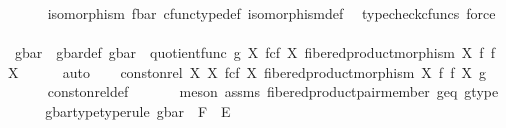 \begin{isabellebody}
\ \ \ \ \isamarkupfalse%
\ {\isacartoucheopen}isomorphism\ f{\isacharunderscore}{\kern0pt}bar{\isacartoucheclose}\ cfunc{\isacharunderscore}{\kern0pt}type{\isacharunderscore}{\kern0pt}def\ isomorphism{\isacharunderscore}{\kern0pt}def\ \isamarkupfalse%
\ {\isacharparenleft}{\kern0pt}typecheck{\isacharunderscore}{\kern0pt}cfuncs{\isacharcomma}{\kern0pt}\ force{\isacharparenright}{\kern0pt}\isanewline
\ \ \isanewline
\ \ \isamarkupfalse%
\ g{\isacharunderscore}{\kern0pt}bar\ \ g{\isacharunderscore}{\kern0pt}bar{\isacharunderscore}{\kern0pt}def{\isacharcolon}{\kern0pt}\ {\isachardoublequoteopen}g{\isacharunderscore}{\kern0pt}bar\ {\isacharequal}{\kern0pt}\ quotient{\isacharunderscore}{\kern0pt}func\ g\ {\isacharparenleft}{\kern0pt}X\ \isactrlbsub f\isactrlesub {\isasymtimes}\isactrlsub c\isactrlbsub f\isactrlesub \ X{\isacharcomma}{\kern0pt}\ fibered{\isacharunderscore}{\kern0pt}product{\isacharunderscore}{\kern0pt}morphism\ X\ f\ f\ X{\isacharparenright}{\kern0pt}{\isachardoublequoteclose}\isanewline
\ \ \ \ \isamarkupfalse%
\ auto\isanewline
\ \ \isamarkupfalse%
\ {\isachardoublequoteopen}const{\isacharunderscore}{\kern0pt}on{\isacharunderscore}{\kern0pt}rel\ X\ {\isacharparenleft}{\kern0pt}X\ \isactrlbsub f\isactrlesub {\isasymtimes}\isactrlsub c\isactrlbsub f\isactrlesub \ X{\isacharcomma}{\kern0pt}\ fibered{\isacharunderscore}{\kern0pt}product{\isacharunderscore}{\kern0pt}morphism\ X\ f\ f\ X{\isacharparenright}{\kern0pt}\ g{\isachardoublequoteclose}\isanewline
\ \ \ \ \isamarkupfalse%
\ const{\isacharunderscore}{\kern0pt}on{\isacharunderscore}{\kern0pt}rel{\isacharunderscore}{\kern0pt}def\ \isanewline
\ \ \ \ \isamarkupfalse%
\ {\isacharparenleft}{\kern0pt}meson\ assms{\isacharparenleft}{\kern0pt}{}{\isacharparenright}{\kern0pt}\ fibered{\isacharunderscore}{\kern0pt}product{\isacharunderscore}{\kern0pt}pair{\isacharunderscore}{\kern0pt}member{}\ g{\isacharunderscore}{\kern0pt}eq\ g{\isacharunderscore}{\kern0pt}type{\isacharparenright}{\kern0pt}\isanewline
\ \ \isamarkupfalse%
\ \isamarkupfalse%
\ g{\isacharunderscore}{\kern0pt}bar{\isacharunderscore}{\kern0pt}type{\isacharbrackleft}{\kern0pt}type{\isacharunderscore}{\kern0pt}rule{\isacharbrackright}{\kern0pt}{\isacharcolon}{\kern0pt}\ {\isachardoublequoteopen}g{\isacharunderscore}{\kern0pt}bar\ {\isacharcolon}{\kern0pt}\ F\ {\isasymrightarrow}\ E{\isachardoublequoteclose}\isanewline
\ \ \ \ \isamarkupfalse%

\end{isabellebody}
